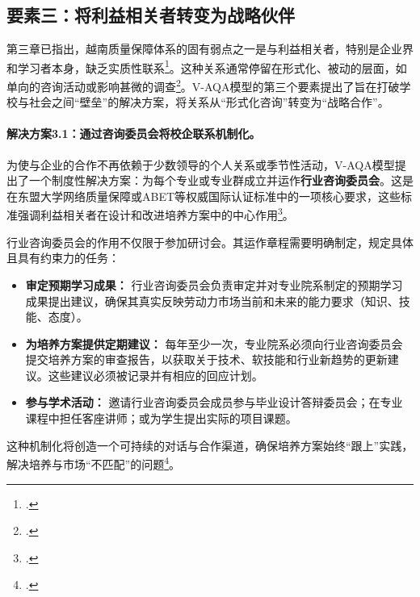 


\subsection{要素三：将利益相关者转变为战略伙伴}
\label{subsec:giaiphap_lienquan}

第三章已指出，越南质量保障体系的固有弱点之一是与利益相关者，特别是企业界和学习者本身，缺乏实质性联系\footcite{worldbank_improvingperformance}。这种关系通常停留在形式化、被动的层面，如单向的咨询活动或影响甚微的调查\footcite{vnujs_er_3848}。V-AQA模型的第三个要素提出了旨在打破学校与社会之间“壁垒”的解决方案，将关系从“形式化咨询”转变为“战略合作”。

\paragraph{解决方案3.1：通过咨询委员会将校企联系机制化。}
为使与企业的合作不再依赖于少数领导的个人关系或季节性活动，V-AQA模型提出了一个制度性解决方案：为每个专业或专业群成立并运作\textbf{行业咨询委员会}。这是在东盟大学网络质量保障或ABET等权威国际认证标准中的一项核心要求，这些标准强调利益相关者在设计和改进培养方案中的中心作用\footcite{aunqa_guidelines_v4}。

行业咨询委员会的作用不仅限于参加研讨会。其运作章程需要明确制定，规定具体且具有约束力的任务：
\begin{itemize}
    \item \textbf{审定预期学习成果：} 行业咨询委员会负责审定并对专业院系制定的预期学习成果提出建议，确保其真实反映劳动力市场当前和未来的能力要求（知识、技能、态度）。
    \item \textbf{为培养方案提供定期建议：} 每年至少一次，专业院系必须向行业咨询委员会提交培养方案的审查报告，以获取关于技术、软技能和行业新趋势的更新建议。这些建议必须被记录并有相应的回应计划。
    \item \textbf{参与学术活动：} 邀请行业咨询委员会成员参与毕业设计答辩委员会；在专业课程中担任客座讲师；或为学生提出实际的项目课题。
\end{itemize}
这种机制化将创造一个可持续的对话与合作渠道，确保培养方案始终“跟上”实践，解决培养与市场“不匹配”的问题\footcite{worldbank_improvingperformance}。

